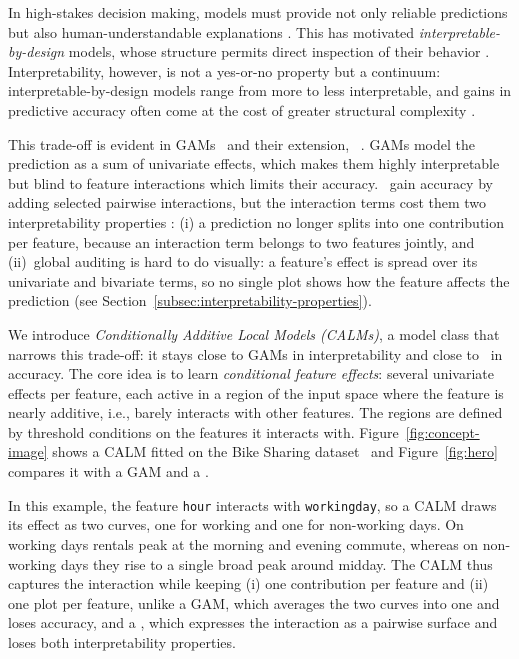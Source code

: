 In high-stakes decision making, models must provide not only reliable predictions but also human-understandable explanations \cite{murdoch2019interpretable, doshi2017towards}. 
This has motivated \emph{interpretable-by-design} models, whose structure permits direct inspection of their behavior \cite{molnar2020interpretable}.
Interpretability, however, is not a yes-or-no property but a continuum: interpretable-by-design models range from more to less interpretable, and gains in predictive accuracy often come at the cost of greater structural complexity \cite{rudin2019stop, lipton2018mythos}.



This trade-off is evident in GAMs~\cite{lou2012intelligible} and their extension, \gamms~\cite{caruana2015intelligible}.
GAMs model the prediction as a sum of univariate effects, which makes them highly interpretable but blind to feature interactions which limits their accuracy.
\gamms~gain accuracy by adding selected pairwise interactions, but the interaction terms cost them two interpretability properties \cite{radenovic2022neural}:
(i) a prediction no longer splits into one contribution per feature, because an interaction term belongs to two features jointly, and
(ii)~global auditing is hard to do visually: a feature's effect is spread over its univariate and bivariate terms, so no single plot shows how the feature affects the prediction (see Section~\ref{subsec:interpretability-properties}).

We introduce \emph{Conditionally Additive Local Models (CALMs)}, a model class that narrows this trade-off: it stays close to GAMs in interpretability and close to \gamms~in accuracy.
The core idea is to learn \emph{conditional feature effects}: several univariate effects per feature, each active in a region of the input space where the feature is nearly additive, i.e., barely interacts with other features.
The regions are defined by threshold conditions on the features it interacts with.
Figure~\ref{fig:concept-image} shows a CALM fitted on the Bike Sharing dataset~\cite{fanaee2014event} and Figure~\ref{fig:hero} compares it with a GAM and a \gamm.

In this example, the feature \texttt{hour} interacts with \texttt{workingday}, so a CALM draws its effect as two curves, one for working and one for non-working days.
On working days rentals peak at the morning and evening commute, whereas on non-working days they rise to a single broad peak around midday.
The CALM thus captures the interaction while keeping (i) one contribution per feature and (ii) one plot per feature, unlike a GAM, which averages the two curves into one and loses accuracy, and a \gamm{}, which expresses the interaction as a pairwise surface and loses both interpretability properties.

